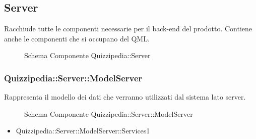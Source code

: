 \subsection{Server}
Racchiude tutte le componenti necessarie per il back-end del prodotto. Contiene anche le componenti che si occupano del QML.
\begin{figure}[H]
\centering
\noindent{}
\caption{Schema Componente Quizzipedia::Server}
\end{figure}
\subsubsection{Quizzipedia::Server::ModelServer}
Rappresenta il modello dei dati che verranno utilizzati dal sistema lato server.
\begin{figure}[H]
\centering
\noindent{}
\caption{Schema Componente Quizzipedia::Server::ModelServer}
\end{figure}
\begin{itemize}
\item Quizzipedia::Server::ModelServer::Services1
\end{itemize}

